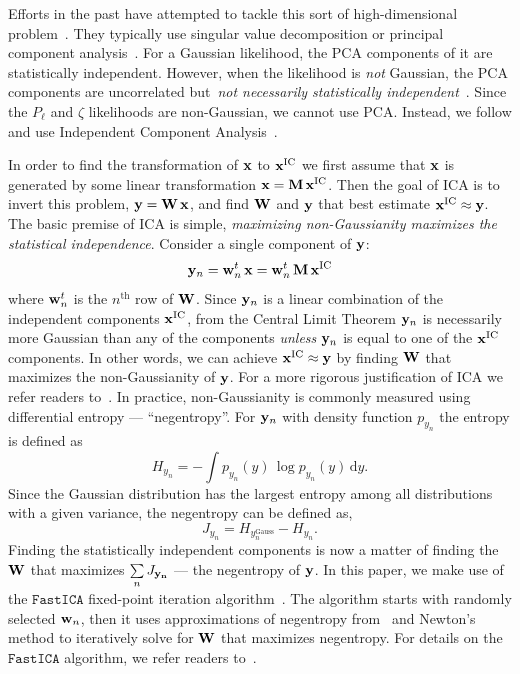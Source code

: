 \documentclass[12pt, letterpaper, preprint]{aastex6}
\newcommand{\beq}{\begin{equation}}
\newcommand{\eeq}{\end{equation}}
\newcommand{\pca}{{\small{PCA}}\xspace}
\newcommand{\ica}{{\small{ICA}}\xspace}
\begin{document}
Efforts in the past have attempted to tackle this sort of 
high-dimensional problem~\citep[\emph{e.g.}][]{scoccimarro2000,eisenstein2001,gaztanaga2005,norberg2009,sinha2017}.
They typically use singular value decomposition or principal 
component analysis~\citep[PCA;][]{Press:1992:NRC:148286}. For a Gaussian
likelihood, the PCA components of it are statistically independent. 
However, when the likelihood is \emph{not} Gaussian, the PCA components 
are uncorrelated but~\emph{not necessarily statistically independent}~\citep{hartlap2009}. 
Since the $P_\ell$ and $\zeta$ likelihoods are non-Gaussian, we cannot 
use \pca. Instead, we follow \cite{hartlap2009} and use Independent 
Component Analysis~\citep[\ica][]{herault1984,comon1994,hyvarinen2000,
hyvarinen2001independent}. 

In order to find the transformation of ${\bf x}$ to ${\bf x}^\mathrm{IC}$ 
we first assume that ${\bf x}$ is generated by some linear transformation
${\bf x} = {\bf M}\,{\bf x}^\mathrm{IC}$. Then the goal of \ica is to invert 
this problem, ${\bf y} = {\bf W}\,{\bf x}$, and find ${\bf W}$ and ${\bf y}$ 
that best estimate ${\bf x}^\mathrm{IC} \approx {\bf y}$. The basic 
premise of ICA is simple, \emph{maximizing non-Gaussianity maximizes the 
statistical independence}. Consider a single component of ${\bf y}$: 
\beq
{\bf y}_n = {\bf w}_n^{\tiny t}\,{\bf x} = {\bf w}_n^{\tiny t}\,{\bf M}\,{\bf x}^\mathrm{IC} 
\eeq
where ${\bf w}_n^{\tiny t}$ is the $n^\mathrm{th}$ row of ${\bf W}$. 
Since ${\bf y}_n$ is a linear combination of the independent 
components ${\bf x}^\mathrm{IC}$, from the Central Limit Theorem 
${\bf y}_n$ is necessarily more Gaussian than any of the 
components \emph{unless} ${\bf y}_n$ is equal to one of the 
${\bf x}^\mathrm{IC}$ components. In other words, we can achieve 
${\bf x}^\mathrm{IC} \approx {\bf y}$ by finding ${\bf W}$ that 
maximizes the non-Gaussianity of ${\bf y}$. For a more rigorous 
justification of ICA we refer readers to~\cite{hyvarinen2001independent}. 
In practice, non-Gaussianity is commonly measured using differential
entropy --- ``negentropy''. For ${\bf y}_n$ with density function 
$p_{y_n}$ the entropy is defined as
\beq
H_{y_n} =  - \int p_{y_n} (y)\, \log p_{y_n}(y)\, \mathrm{d}y. 
\eeq
Since the Gaussian distribution has the largest entropy among all 
distributions with a given variance, the negentropy can be defined 
as, 
\beq
J_{y_n} = H_{y_n^\mathrm{Gauss}} - H_{y_n}. 
\eeq
Finding the statistically independent components is now a matter
of finding the ${\bf W}$ that maximizes $\sum\limits_{n} J_{\bf y_n}$
--- the negentropy of ${\bf y}$. In this paper, we make use of the 
$\mathtt{FastICA}$ fixed-point iteration algorithm~\citep{hyvarinen1999}. 
The algorithm starts with randomly selected ${\bf w}_n$, then it uses 
approximations of negentropy from~\cite{hyvarinen1998} and Newton's method 
to iteratively solve for ${\bf W}$ that maximizes negentropy. For details 
on the $\mathtt{FastICA}$ algorithm, we refer readers to~\cite{hyvarinen1999}.
\end{document}
